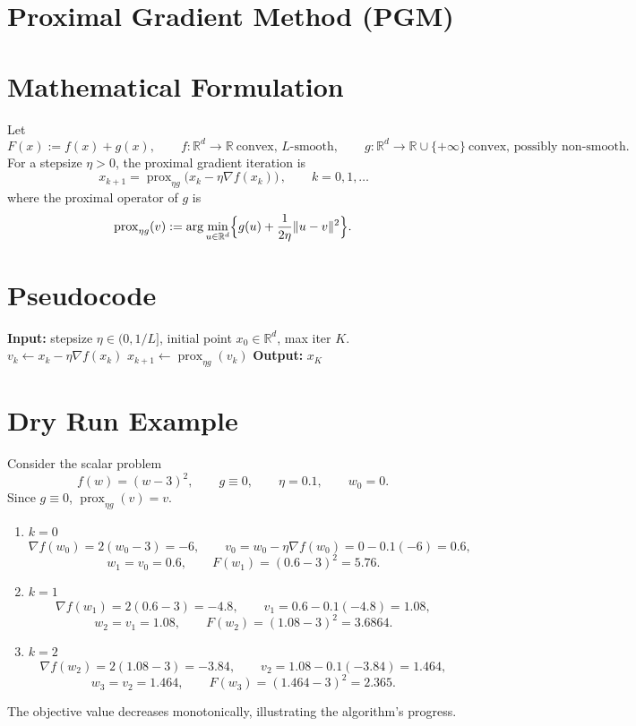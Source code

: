 \documentclass{article}
\begin{document}
\section*{Proximal Gradient Method (PGM)}

\section*{Mathematical Formulation}
Let  
\[
F(x):=f(x)+g(x),\qquad f:\mathbb{R}^{d}\to\mathbb{R}\ \text{convex, $L$-smooth},\qquad   
g:\mathbb{R}^{d}\to\mathbb{R}\cup\{+\infty\}\ \text{convex, possibly non‑smooth}.
\]
For a stepsize $\eta>0$, the proximal gradient iteration is  
\[
\boxed{\,x_{k+1}= \operatorname{prox}_{\eta g}\bigl(x_{k}-\eta\nabla f(x_{k})\bigr)\,},\qquad k=0,1,\dots
\]
where the proximal operator of $g$ is  
\[
\operatorname{prox}_{\eta g}(v):=\arg\min_{u\in\mathbb{R}^{d}}\Bigl\{ g(u)+\frac{1}{2\eta}\|u-v\|^{2}\Bigr\}.
\]

\section*{Pseudocode}
\begin{algorithm}[H]
\caption{Proximal Gradient Method}
\begin{algorithmic}[1]
\State \textbf{Input:} stepsize $\eta\in(0,1/L]$, initial point $x_{0}\in\mathbb{R}^{d}$, max iter $K$.
    \State $v_{k}\gets x_{k}-\eta\nabla f(x_{k})$ 
    \State $x_{k+1}\gets \operatorname{prox}_{\eta g}(v_{k})$ 
\EndFor
\State \textbf{Output:} $x_{K}$
\end{algorithmic}
\end{algorithm}

\section*{Dry Run Example}
Consider the scalar problem  
\[
f(w)=(w-3)^{2},\qquad g\equiv 0,\qquad \eta=0.1,\qquad w_{0}=0 .
\]
Since $g\equiv0$, $\operatorname{prox}_{\eta g}(v)=v$.

\begin{enumerate}[label=\textbf{Iter \arabic*:},leftmargin=*]
\item $k=0$  
\[
\nabla f(w_{0})=2(w_{0}-3)=-6,\qquad 
v_{0}=w_{0}-\eta\nabla f(w_{0})=0-0.1(-6)=0.6,
\]
\[
w_{1}=v_{0}=0.6,\qquad F(w_{1})=(0.6-3)^{2}=5.76.
\]

\item $k=1$  
\[
\nabla f(w_{1})=2(0.6-3)=-4.8,\qquad 
v_{1}=0.6-0.1(-4.8)=1.08,
\]
\[
w_{2}=v_{1}=1.08,\qquad F(w_{2})=(1.08-3)^{2}=3.6864.
\]

\item $k=2$  
\[
\nabla f(w_{2})=2(1.08-3)=-3.84,\qquad 
v_{2}=1.08-0.1(-3.84)=1.464,
\]
\[
w_{3}=v_{2}=1.464,\qquad F(w_{3})=(1.464-3)^{2}=2.365.
\]
\end{enumerate}
The objective value decreases monotonically, illustrating the algorithm’s progress.
\end{document}
